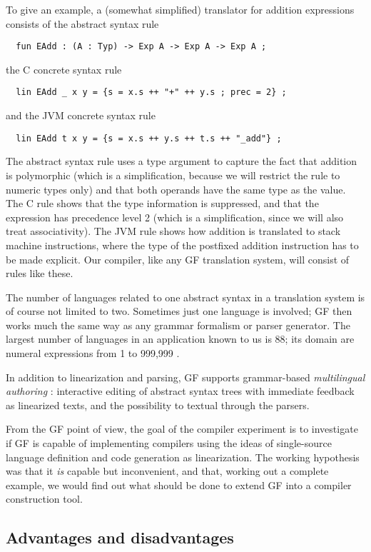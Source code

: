 \documentclass[12pt]{article}
\newcommand{\empha}[1]{{\em #1}}
\begin{document}
To give an example,
a (somewhat simplified) translator for addition expressions
consists of the abstract syntax rule
\begin{verbatim}
  fun EAdd : (A : Typ) -> Exp A -> Exp A -> Exp A ;
\end{verbatim}
the C concrete syntax rule
\begin{verbatim}
  lin EAdd _ x y = {s = x.s ++ "+" ++ y.s ; prec = 2} ;
\end{verbatim}
and the JVM concrete syntax rule
\begin{verbatim}
  lin EAdd t x y = {s = x.s ++ y.s ++ t.s ++ "_add"} ;
\end{verbatim}
The abstract syntax rule uses a type argument to capture
the fact that addition is polymorphic (which is a simplification,
because we will restrict the rule to numeric types only)
and that both operands have the same type as the value.
The C rule shows that the type information is suppressed,
and that the expression has precedence level 2 (which is a simplification,
since we will also treat associativity).
The JVM rule shows how addition is translated to stack machine
instructions, where the type of the postfixed addition instruction has to
be made explicit. Our compiler, like any GF translation system, will
consist of rules like these.

The number of languages related to one abstract syntax in
a translation system is of course not limited to two. 
Sometimes just one language is involved; 
GF then works much the same way as any grammar 
formalism or parser generator. 
The largest number of languages in an application known to us is 88;
its domain are numeral expressions from 1 to 999,999 \cite{gf-homepage}.

In addition to linearization and parsing, GF supports grammar-based
\empha{multilingual authoring} \cite{khegai}: interactive editing
of abstract syntax trees with immediate feedback as linearized texts,
and the possibility to textual through the parsers. 
 
From the GF point of view, the goal of the compiler experiment
is to investigate if GF is capable of implementing
compilers using the ideas of single-source language definition
and code generation as linearization. The working hypothesis
was that it \textit{is} capable but inconvenient, and that,
working out a complete example, we would find out what 
should be done to extend GF into a compiler construction tool.


\subsection{Advantages and disadvantages}
\end{document}
